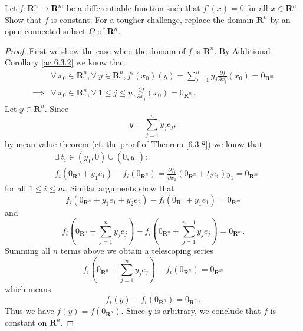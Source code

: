 \begin{exercise}\label{ex 6.3.4}
    Let \(f : \mathbf{R}^n \to \mathbf{R}^m\) be a differentiable function such that \(f'(x) = 0\) for all \(x \in \mathbf{R}^n\).
    Show that \(f\) is constant.
    For a tougher challenge, replace the domain \(\mathbf{R}^n\) by an open connected subset \(\Omega\) of \(\mathbf{R}^n\).
\end{exercise}

\begin{proof}
    First we show the case when the domain of \(f\) is \(\mathbf{R}^n\).
    By Additional Corollary \ref{ac 6.3.2} we know that
    \begin{align*}
                 & \forall\ x_0 \in \mathbf{R}^n, \forall\ y \in \mathbf{R}^n, f'(x_0)(y) = \sum_{j = 1}^n y_j \frac{\partial f}{\partial x_j}(x_0) = 0_{\mathbf{R}^m} \\
        \implies & \forall\ x_0 \in \mathbf{R}^n, \forall\ 1 \leq j \leq n, \frac{\partial f}{\partial x_j}(x_0) = 0_{\mathbf{R}^m}.
    \end{align*}
    Let \(y \in \mathbf{R}^n\).
    Since
    \[
        y = \sum_{j = 1}^n y_j e_j,
    \]
    by mean value theorem (cf. the proof of Theorem \ref{6.3.8}) we know that
    \begin{align*}
         & \exists\ t_i \in (y_1, 0) \cup (0, y_1) :                                                                                                      \\
         & f_i(0_{\mathbf{R}^n} + y_1 e_1) - f_i(0_{\mathbf{R}^n}) = \frac{\partial f_i}{\partial x_1}(0_{\mathbf{R}^n} + t_i e_1) y_1 = 0_{\mathbf{R}^m}
    \end{align*}
    for all \(1 \leq i \leq m\).
    Similar arguments show that
    \[
        f_i(0_{\mathbf{R}^n} + y_1 e_1 + y_2 e_2) - f_i(0_{\mathbf{R}^n} + y_1 e_1) = 0_{\mathbf{R}^m}
    \]
    and
    \[
        f_i(0_{\mathbf{R}^n} + \sum_{j = 1}^n y_j e_j) - f_i(0_{\mathbf{R}^n} + \sum_{j = 1}^{n - 1} y_j e_j) = 0_{\mathbf{R}^m}.
    \]
    Summing all \(n\) terms above we obtain a telescoping series
    \[
        f_i(0_{\mathbf{R}^n} + \sum_{j = 1}^n y_j e_j) - f_i(0_{\mathbf{R}^n}) = 0_{\mathbf{R}^m}
    \]
    which means
    \[
        f_i(y) - f_i(0_{\mathbf{R}^n}) = 0_{\mathbf{R}^m}.
    \]
    Thus we have \(f(y) = f(0_{\mathbf{R}^n})\).
    Since \(y\) is arbitrary, we conclude that \(f\) is constant on \(\mathbf{R}^n\).


\end{proof}
